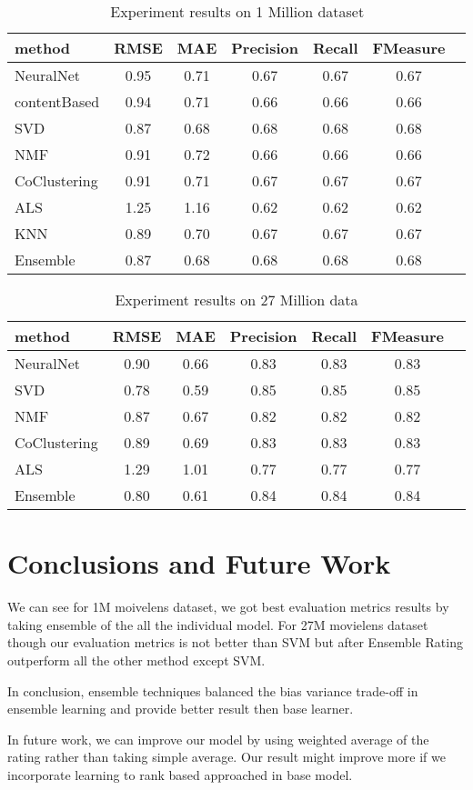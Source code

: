 \documentclass[sigconf]{acmart}
\begin{document}
\begin{table}
   \caption{Experiment results on 1 Million dataset}\label{tab:Experiment results 1M}
   \small
   \begin{tabular}{|l|c|c|c|c|c|c|}
   \hline
   method&RMSE&MAE&Precision&Recall&FMeasure \\
   \hline\hline
   NeuralNet&0.95&0.71&0.67&0.67&0.67\\
   \hline
   contentBased&0.94&0.71&0.66&0.66&0.66\\
   \hline
   SVD&0.87&0.68&0.68&0.68&0.68\\
   \hline
   NMF&0.91&0.72&0.66&0.66&0.66\\
   \hline
   CoClustering&0.91&0.71&0.67&0.67&0.67\\
   \hline
   ALS&1.25&1.16&0.62&0.62&0.62\\
   \hline
   KNN&0.89&0.70&0.67&0.67&0.67\\
   \hline
   Ensemble&0.87&0.68&0.68&0.68&0.68\\
   \hline
   \end{tabular}
\end{table}

\begin{table}
   \caption{Experiment results on 27 Million data}\label{tab:Experiment results 27M}
   \small 
   \begin{tabular}{|l|c|c|c|c|c|c|}
   \hline
   method&RMSE&MAE&Precision&Recall&FMeasure \\
   \hline\hline
   NeuralNet&0.90&0.66&0.83&0.83&0.83\\
   \hline
   SVD&0.78&0.59&0.85&0.85&0.85\\
   \hline
   NMF&0.87&0.67&0.82&0.82&0.82\\
   \hline
   CoClustering&0.89&0.69&0.83&0.83&0.83\\
   \hline
   ALS&1.29&1.01&0.77&0.77&0.77\\
   \hline
   Ensemble&0.80&0.61&0.84&0.84&0.84\\
   \hline
   \end{tabular}
\end{table}



\section{Conclusions and Future Work}\label{sec:conclusions}
We can see for 1M moivelens dataset, we got best evaluation metrics results by taking ensemble of the all the individual model. For 27M movielens dataset though our evaluation metrics is not better than SVM but after Ensemble Rating outperform all the other method except SVM.

In conclusion, ensemble techniques balanced the bias variance trade-off in ensemble learning and provide better result then base learner.

In future work, we can improve our model by using weighted average of the rating rather than taking simple average. Our result might improve more if we incorporate learning to rank based approached in base model.


\balance

\end{document}
